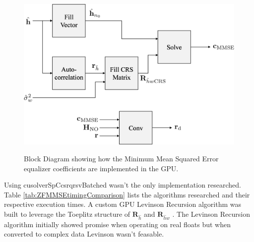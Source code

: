 \begin{figure}
	\centering\includegraphics[width=7.98in/100*55]{figures/eq_GPUimplementation/blockMMSE.pdf}
	\label{fig:blockMMSE}
	\caption{Block Diagram showing how the Minimum Mean Squared Error equalizer coefficients are implemented in the GPU.}
\end{figure}

Using cusolverSpCcsrqrsvBatched wasn't the only implementation researched.
Table \ref{tab:ZFMMSEtimingComparison} lists the algorithms researched and their respective execution times.
A custom GPU Levinson Recursion algorithm was built to leverage the Toeplitz structure of $\mathbf{R}_{\hat{h}}$ and $\mathbf{R}_{\hat{h}w}$ \cite[Chap. 5]{hayes:1996}. 
The Levinson Recursion algorithm initially showed promise when operating on real floats but when converted to complex data Levinson wasn't feasable.

